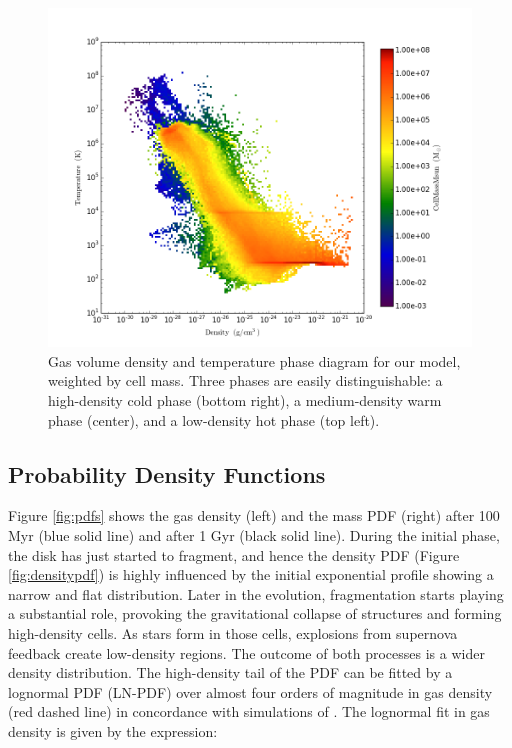 \documentclass[twocolumn]{aastex}
\begin{document}
	\begin{figure}[h!]
	\begin{center}
	\includegraphics[scale=0.5]{./f3.png}
	\caption{Gas volume density and temperature phase diagram for our model, weighted by cell mass. Three phases are easily distinguishable: a high-density cold phase (bottom right), a medium-density warm phase (center), and a low-density hot phase (top left).}
	\label{fig:phase}
	\end{center}
	\end{figure}

\subsection{Probability Density Functions}
\label{subsec:PDFs}

Figure \ref{fig:pdfs} shows the gas density (left) and the mass PDF (right) after 100 Myr (blue solid line) and after 1 Gyr (black solid line). During the initial phase, the disk has just started to fragment, and hence the density PDF (Figure \ref{fig:densitypdf}) is highly influenced by the initial exponential profile showing a narrow and flat distribution. Later in the evolution, fragmentation starts playing a substantial role, provoking the gravitational collapse of structures and forming high-density cells. As stars form in those cells, explosions from supernova feedback create low-density regions. The outcome of both processes is a wider density distribution. The high-density tail of the PDF can be fitted by a lognormal PDF (LN-PDF) over almost four orders of magnitude in gas density (red dashed line) in concordance with simulations of \citet{Wada_01, Kravtsov_03, Wada_07, Tasker_08}. The lognormal fit in gas density is given by the expression:
\end{document}
